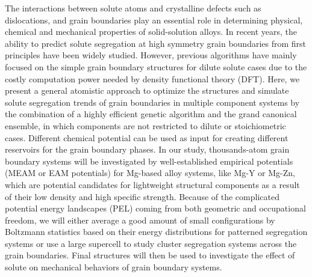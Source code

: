 The interactions between solute atoms and crystalline defects such as dislocations, and grain boundaries play an essential role in determining physical, chemical and mechanical properties of solid-solution alloys. In recent years, the ability to predict solute segregation at high symmetry grain boundaries from first principles have been widely studied. However, previous algorithms have mainly focused on the simple grain boundary structures for dilute solute cases due to the costly computation power needed by density functional theory (DFT). Here, we present a general atomistic approach to optimize the structures and simulate solute segregation trends of grain boundaries in multiple component systems by the combination of a highly efficient genetic algorithm and the grand canonical ensemble, in which components are not restricted to dilute or stoichiometric cases. Different chemical potential can be used as input for creating different reservoirs for the grain boundary phases. In our study, thousands-atom grain boundary systems will be investigated by well-established empirical potentials (MEAM or EAM potentials) for Mg-based alloy systems, like Mg-Y or Mg-Zn, which are potential candidates for lightweight structural components as a result of their low density and high specific strength. Because of the complicated potential energy landscapes (PEL) coming from both geometric and occupational freedom, we will either average a good amount of small configurations by Boltzmann statistics based on their energy distributions for patterned segregation systems or use a large supercell to study cluster segregation systems across the grain boundaries. Final structures will then be used to investigate the effect of solute on mechanical behaviors of grain boundary systems.

